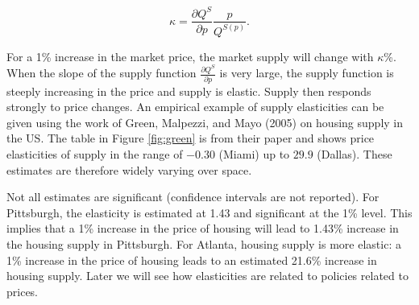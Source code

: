 \documentclass[
]{book}
\begin{document}
\begin{equation}
\kappa = \frac{\partial Q^S}{\partial p}\frac{p}{Q^{S(p)}}.
\end{equation}

For a 1\% increase in the market price, the market supply will change with \(\kappa\)\%. When the slope of the supply function \(\frac{\partial Q^S}{\partial p}\) is very large, the supply function is steeply increasing in the price and supply is elastic. Supply then responds strongly to price changes. An empirical example of supply elasticities can be given using the work of Green, Malpezzi, and Mayo (2005) on housing supply in the US. The table in Figure \ref{fig:green} is from their paper and shows price elasticities of supply in the range of \(-0.30\) (Miami) up to \(29.9\) (Dallas). These estimates are therefore widely varying over space.

Not all estimates are significant (confidence intervals are not reported). For Pittsburgh, the elasticity is estimated at 1.43 and significant at the 1\% level. This implies that a 1\% increase in the price of housing will lead to 1.43\% increase in the housing supply in Pittsburgh. For Atlanta, housing supply is more elastic: a 1\% increase in the price of housing leads to an estimated 21.6\% increase in housing supply. Later we will see how elasticities are related to policies related to prices.
\end{document}
